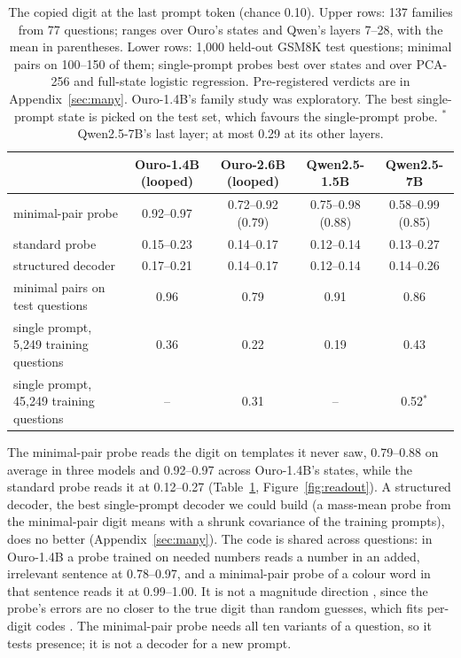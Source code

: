 \documentclass{article}
\begin{document}
\begin{table}[t]
\centering
\caption{The copied digit at the last prompt token (chance 0.10). Upper rows: 137 families from 77 questions; ranges over Ouro's states and Qwen's layers 7--28, with the mean in parentheses. Lower rows: 1,000 held-out GSM8K test questions; minimal pairs on 100--150 of them; single-prompt probes best over states and over PCA-256 and full-state logistic regression. Pre-registered verdicts are in Appendix~\ref{sec:many}. Ouro-1.4B's family study was exploratory. The best single-prompt state is picked on the test set, which favours the single-prompt probe. $^\ast$Qwen2.5-7B's last layer; at most 0.29 at its other layers.}
\label{tab:presence}
\small
\setlength{\tabcolsep}{4pt}
\begin{tabular}{@{}lcccc@{}}
\toprule
 & Ouro-1.4B (looped) & Ouro-2.6B (looped) & Qwen2.5-1.5B & Qwen2.5-7B \\
\midrule
minimal-pair probe & 0.92--0.97 & 0.72--0.92 (0.79) & 0.75--0.98 (0.88) & 0.58--0.99 (0.85) \\
standard probe & 0.15--0.23 & 0.14--0.17 & 0.12--0.14 & 0.13--0.27 \\
structured decoder & 0.17--0.21 & 0.14--0.17 & 0.12--0.14 & 0.14--0.26 \\
\midrule
minimal pairs on test questions & 0.96 & 0.79 & 0.91 & 0.86 \\
single prompt, 5,249 training questions & 0.36 & 0.22 & 0.19 & 0.43 \\
single prompt, 45,249 training questions & -- & 0.31 & -- & 0.52$^\ast$ \\
\bottomrule
\end{tabular}
\end{table}

The minimal-pair probe reads the digit on templates it never saw, 0.79--0.88 on average in three models and 0.92--0.97 across Ouro-1.4B's states, while the standard probe reads it at 0.12--0.27 (Table~\ref{tab:presence}, Figure~\ref{fig:readout}). A structured decoder, the best single-prompt decoder we could build (a mass-mean probe from the minimal-pair digit means with a shrunk covariance of the training prompts), does no better (Appendix~\ref{sec:many}). The code is shared across questions: in Ouro-1.4B a probe trained on needed numbers reads a number in an added, irrelevant sentence at 0.78--0.97, and a minimal-pair probe of a colour word in that sentence reads it at 0.99--1.00. It is not a magnitude direction \citep{zhuf2024}, since the probe's errors are no closer to the true digit than random guesses, which fits per-digit codes \citep{levy2025}. The minimal-pair probe needs all ten variants of a question, so it tests presence; it is not a decoder for a new prompt.
\end{document}
